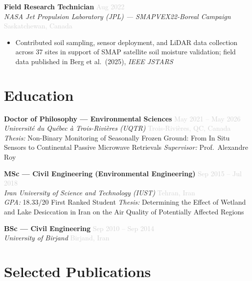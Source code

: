 \documentclass[10pt, a4paper]{article}
\newcommand{\dategray}[1]{\textcolor{lightgray}{\small #1}}
\newcommand{\jobtitle}[4]{%
  \noindent\textbf{#1} \hfill \dategray{#3} \\
  \textit{#2} \hfill \dategray{#4} \\[-4pt]
}
\begin{document}
\vspace{6pt}

\jobtitle{Field Research Technician}
         {NASA Jet Propulsion Laboratory (JPL) --- SMAPVEX22-Boreal Campaign}
         {Aug 2022}
         {Saskatchewan, Canada}
\begin{itemize}
  \item Contributed soil sampling, sensor deployment, and LiDAR data
        collection across 37 sites in support of SMAP satellite soil moisture
        validation; field data published in Berg et al.\ (2025),
        \textit{IEEE JSTARS}
\end{itemize}

\section{Education}

\jobtitle{Doctor of Philosophy --- Environmental Sciences}
         {Université du Québec à Trois-Rivières (UQTR)}
         {May 2021 -- May 2026}
         {Trois-Rivières, QC, Canada}

\noindent\textit{Thesis:} Non-Binary Monitoring of Seasonally Frozen Ground:
From In Situ Sensors to Continental Passive Microwave Retrievals \quad
\textit{Supervisor:} Prof.\ Alexandre Roy

\vspace{6pt}

\jobtitle{MSc --- Civil Engineering (Environmental Engineering)}
         {Iran University of Science and Technology (IUST)}
         {Sep 2015 -- Jul 2018}
         {Tehran, Iran}

\noindent\textit{GPA:} 18.33/20 \quad First Ranked Student \quad
\textit{Thesis:} Determining the Effect of Wetland and Lake Desiccation in Iran
on the Air Quality of Potentially Affected Regions

\vspace{6pt}

\jobtitle{BSc --- Civil Engineering}
         {University of Birjand}
         {Sep 2010 -- Sep 2014}
         {Birjand, Iran}

\section{Selected Publications}
\end{document}
